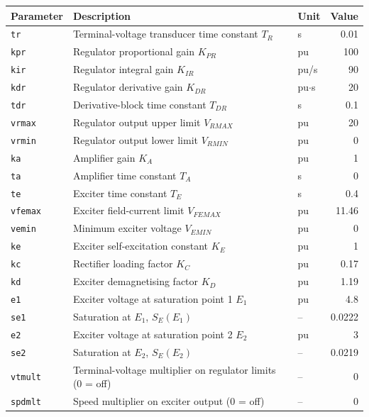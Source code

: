 \begin{tabularx}{\linewidth}{@{}l X l r@{}}
\toprule
\textbf{Parameter} & \textbf{Description} & \multicolumn{1}{c}{\textbf{Unit}} & \multicolumn{1}{c}{\textbf{Value}} \\
\midrule
\texttt{tr} & Terminal-voltage transducer time constant $T_R$ & s & 0.01 \\
\texttt{kpr} & Regulator proportional gain $K_{PR}$ & pu & 100 \\
\texttt{kir} & Regulator integral gain $K_{IR}$ & pu/s & 90 \\
\texttt{kdr} & Regulator derivative gain $K_{DR}$ & pu$\cdot$s & 20 \\
\texttt{tdr} & Derivative-block time constant $T_{DR}$ & s & 0.1 \\
\texttt{vrmax} & Regulator output upper limit $V_{RMAX}$ & pu & 20 \\
\texttt{vrmin} & Regulator output lower limit $V_{RMIN}$ & pu & 0 \\
\texttt{ka} & Amplifier gain $K_A$ & pu & 1 \\
\texttt{ta} & Amplifier time constant $T_A$ & s & 0 \\
\texttt{te} & Exciter time constant $T_E$ & s & 0.4 \\
\texttt{vfemax} & Exciter field-current limit $V_{FEMAX}$ & pu & 11.46 \\
\texttt{vemin} & Minimum exciter voltage $V_{EMIN}$ & pu & 0 \\
\texttt{ke} & Exciter self-excitation constant $K_E$ & pu & 1 \\
\texttt{kc} & Rectifier loading factor $K_C$ & pu & 0.17 \\
\texttt{kd} & Exciter demagnetising factor $K_D$ & pu & 1.19 \\
\texttt{e1} & Exciter voltage at saturation point 1 $E_1$ & pu & 4.8 \\
\texttt{se1} & Saturation at $E_1$, $S_E(E_1)$ & -- & 0.0222 \\
\texttt{e2} & Exciter voltage at saturation point 2 $E_2$ & pu & 3 \\
\texttt{se2} & Saturation at $E_2$, $S_E(E_2)$ & -- & 0.0219 \\
\texttt{vtmult} & Terminal-voltage multiplier on regulator limits (0 = off) & -- & 0 \\
\texttt{spdmlt} & Speed multiplier on exciter output (0 = off) & -- & 0 \\
\bottomrule
\end{tabularx}
